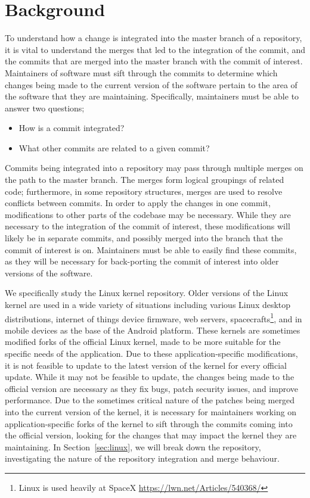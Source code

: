 \chapter{Background}\label{chap:background}

To understand how a change is integrated into the master branch of a
repository, it is vital to understand the merges that led to the
integration of the commit, and the commits that are merged into the
master branch with the commit of interest. Maintainers of software must
sift through the commits to determine which changes being made to the
current version of the software pertain to the area of the software that
they are maintaining. Specifically, maintainers must be able to answer
two questions;

\begin{textbox}
\begin{itemize}
  \item How is a commit integrated?
  \item What other commits are related to a given commit?
\end{itemize}
\end{textbox}

Commits being integrated into a repository may pass through multiple
merges on the path to the master branch. The merges form logical
groupings of related code; furthermore, in some repository structures,
merges are used to resolve conflicts between commits. In order to apply
the changes in one commit, modifications to other parts of the codebase
may be necessary. While they are necessary to the integration of the
commit of interest, these modifications will likely be in separate
commits, and possibly merged into the branch that the commit of interest
is on. Maintainers must be able to easily find these commits, as they
will be necessary for back-porting the commit of interest into older
versions of the software.

We specifically study the Linux kernel repository. Older versions of the
Linux kernel are used in a wide variety of situations including various
Linux desktop distributions, internet of things device firmware, web
servers, spacecrafts\footnote{Linux is used heavily at SpaceX
  \url{https://lwn.net/Articles/540368/}}, and in mobile devices as the
base of the Android platform. These kernels are sometimes modified forks
of the official Linux kernel, made to be more suitable for the specific
needs of the application. Due to these application-specific
modifications, it is not feasible to update to the latest version of the
kernel for every official update. While it may not be feasible to
update, the changes being made to the official version are necessary as
they fix bugs, patch security issues, and improve performance. Due to
the sometimes critical nature of the patches being merged into the
current version of the kernel, it is necessary for maintainers working
on application-specific forks of the kernel to sift through the commits
coming into the official version, looking for the changes that may
impact the kernel they are maintaining. In Section~\ref{sec:linux}, we
will break down the repository, investigating the nature of the
repository integration and merge behaviour.

